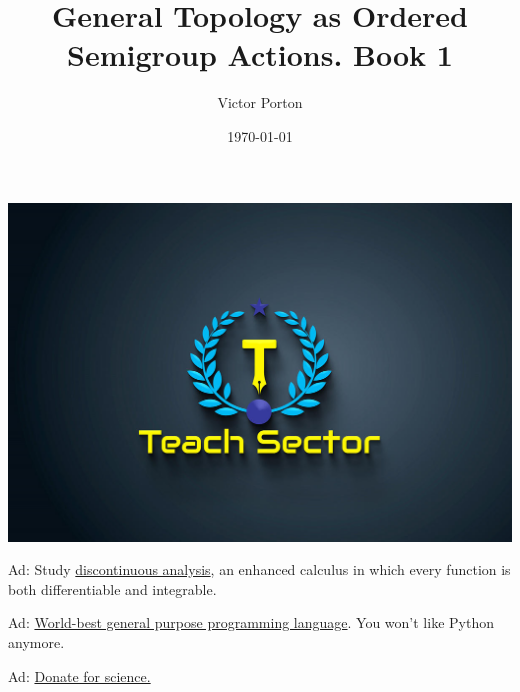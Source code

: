 \documentclass[a4paper,oneside,english,reqno]{amsbook}
\numberwithin{section}{chapter}
\let\noindent\empty %
\begin{document}
\noindent
\href{https://teachsector.com/limit/}{\includegraphics[scale=0.3]{img/Teach-Sector.jpeg}}

\noindent
Ad: Study \href{https://teachsector.com/limit/}{discontinuous analysis}, an enhanced
calculus in which every function is both differentiable and integrable.

\noindent
Ad: \href{https://teachsector.com/dforpython/}{World-best general purpose programming language}.
You won't like Python anymore.

\noindent
Ad: \href{https://science-dao.org}{Donate for science.}

\title{General Topology as Ordered Semigroup Actions. Book 1}


\author{Victor Porton}






\date{\today}
\end{document}
